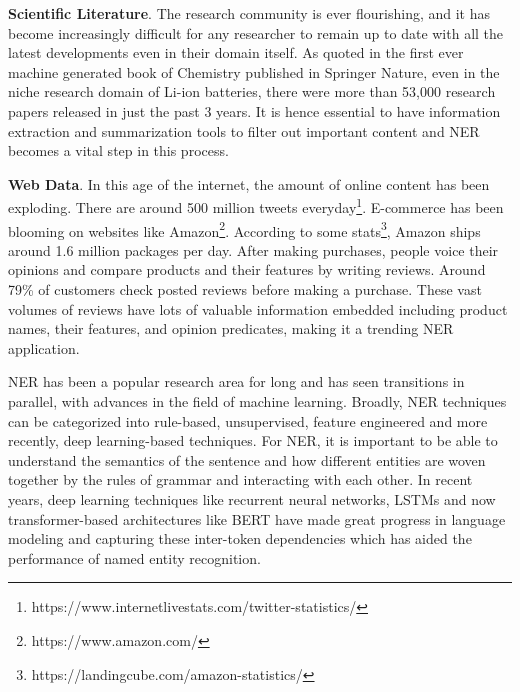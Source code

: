 \textbf{Scientific Literature}. The research community is ever flourishing, and it has become increasingly difficult for any researcher to remain up to date with all the latest developments even in their domain itself. As quoted in the first ever machine generated book of Chemistry published in Springer Nature\cite{writer2019lithium}, even in the niche research domain of Li-ion batteries, there were more than 53,000 research papers released in just the past 3 years. It is hence essential to have information extraction and summarization tools to filter out important content and NER becomes a vital step in this process.

\textbf{Web Data}. In this age of the internet, the amount of online content has been exploding. There are around 500 million tweets everyday\footnote{https://www.internetlivestats.com/twitter-statistics/}. E-commerce has been blooming on websites like Amazon\footnote{https://www.amazon.com/}. According to some stats\footnote{https://landingcube.com/amazon-statistics/}, Amazon ships around 1.6 million packages per day. After making purchases, people voice their opinions and compare products and their features by writing reviews. Around 79\% of customers check posted reviews before making a purchase. These vast volumes of reviews have lots of valuable information embedded including product names, their features, and opinion predicates, making it a trending NER application.

NER has been a popular research area for long and has seen transitions in parallel, with advances in the field of machine learning. Broadly, NER techniques can be categorized into rule-based, unsupervised, feature engineered and more recently, deep learning-based techniques. For NER, it is important to be able to understand the semantics of the sentence and how different entities are woven together by the rules of grammar and interacting with each other. In recent years, deep learning techniques like recurrent neural networks, LSTMs\cite{hochreiter1997long} and now transformer-based\cite{vaswani2017attention} architectures like BERT\cite{devlin2018bert} have made great progress in language modeling and capturing these inter-token dependencies which has aided the performance of named entity recognition. 

    
